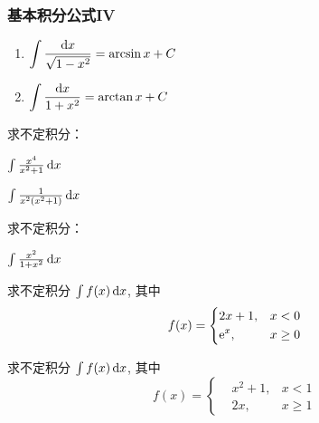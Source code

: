 \documentclass[14pt,notheorems,leqno,xcolor={rgb}]{beamer} %
\begin{document}
\begin{frame}[label=intformula4]
\frametitle{基本积分公式IV}
\begin{enumerate}[<+->]
  \conti
  \item $\displaystyle\int \frac{\mathop{}\!\mathrm{d}{x}}{\sqrt{1-x^2}} = \arcsin x + C$
  \item $\displaystyle\int \frac{\mathop{}\!\mathrm{d}{x}}{1+x^2} = \arctan x + C$
\end{enumerate}
\end{frame}

\begin{frame}
\begin{example}
求不定积分：
\begin{enumlite}
  \item $\int \frac{x^4}{x^2+1} \mathop{}\!\mathrm{d}{x}$
  \item $\int \frac{1}{x^2(x^2+1)} \mathop{}\!\mathrm{d}{x}$
\end{enumlite}
\end{example}
\vpause
\begin{exercise}
求不定积分：
\begin{enumlite}
  \item $\int \frac{x^2}{1+x^2}\mathop{}\!\mathrm{d}{x}$
\end{enumlite}
\end{exercise}
\end{frame}


\begin{frame}
\begin{example}求不定积分 $\int f(x)\mathop{}\!\mathrm{d}{x}$, 其中
\[ f(x)=\left\{
\begin{aligned}
&2x+1, & x<0 \\
&\mathrm{e}^x, & x\geq 0
\end{aligned}\right.\]
\end{example}
\end{frame}

\begin{frame}
\begin{exercise}求不定积分 $\int f(x)\mathop{}\!\mathrm{d}{x}$, 其中
\[ f(x)=\left\{
\begin{aligned}
&x^2+1, & x<1 \\
&2x, & x\geq 1
\end{aligned}\right.\]
\end{exercise}
\end{frame}

\end{document}

